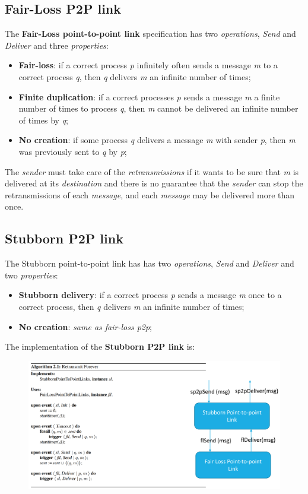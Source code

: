 \documentclass{article}
\begin{document}
\subsection{Fair-Loss P2P link}
The \textbf{Fair-Loss point-to-point link} specification has two \emph{operations}, \emph{Send} and \emph{Deliver} and three \emph{properties}:
\begin{itemize}
\item \textbf{Fair-loss}: if a correct process \emph{p} infinitely often sends a message \emph{m} to a correct process \emph{q}, then \emph{q} delivers\emph{ m }an infinite number of times;
\item \textbf{Finite duplication}: if a correct processes \emph{p} sends a message \emph{m} a finite number of times to process \emph{q}, then \emph{m} cannot be delivered an infinite number of times by \emph{q};
\item \textbf{No creation}: if some process \emph{q} delivers a message \emph{m} with sender \emph{p}, then \emph{m} was previously sent to \emph{q} by \emph{p};
\end{itemize}
The \emph{sender} must take care of the \emph{retransmissions} if it wants to be sure that \emph{m} is delivered at its \emph{destination} and there is no guarantee that the \emph{sender} can stop the retransmissions of each \emph{message}, and each \emph{message} may be delivered more than once. 
\subsection{Stubborn P2P link}
The Stubborn point-to-point link has has two \emph{operations}, \emph{Send} and \emph{Deliver} and two \emph{properties}:
\begin{itemize}
\item \textbf{Stubborn delivery}: if a correct process \emph{p} sends a message \emph{m} once to a correct process, then \emph{q} delivers \emph{m} an infinite number of times; 
\item \textbf{No creation}: \emph{same as fair-loss p2p};
\end{itemize}
The implementation of the \textbf{Stubborn P2P link} is:
\begin{figure}[H]
  \centering
  \includegraphics[scale=0.5, left]{cattura10.png}
\end{figure}
\end{document}
